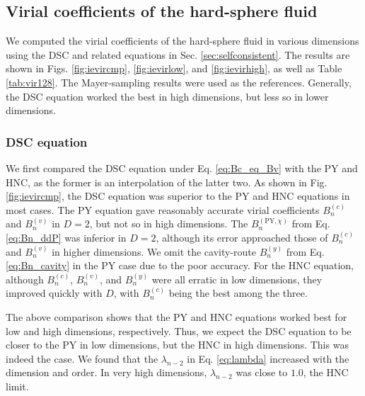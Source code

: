 \documentclass[aip,jcp,preprint,superscriptaddress,showpacs,preprintnumbers,amsmath,amssymb]{revtex4-1}
\begin{document}
\subsection{\label{sec:hs_results}
Virial coefficients of the hard-sphere fluid}





We computed the virial coefficients of the hard-sphere fluid
in various dimensions
using the DSC and related equations
in Sec. \ref{sec:selfconsistent}.
%
The results are shown
in Figs. \ref{fig:ievircmp},
\ref{fig:ievirlow},
and
\ref{fig:ievirhigh},
as well as Table \ref{tab:vir128}.
%
The Mayer-sampling results\cite{zhang2014, schultz2014}
were used as the references.
%
Generally,
the DSC equation worked the best
in high dimensions,
but less so in lower dimensions.





\subsubsection{DSC equation}





We first compared the DSC equation under
Eq. \eqref{eq:Bc_eq_Bv}
with the PY and HNC,
as the former is an interpolation of the latter two.
%
As shown in Fig. \ref{fig:ievircmp},
the DSC equation was superior to the PY and HNC equations
in most cases.
%
The PY equation gave
reasonably accurate virial coefficients
$B_n^{(c)}$ and $B_n^{(v)}$ in $D = 2$,
but not so in high dimensions.
%
The $B_n^{(\mathrm{PY}, \chi)}$
from Eq. \eqref{eq:Bn_ddP}
was inferior in $D = 2$,
although its error approached those
of $B_n^{(c)}$ and $B_n^{(v)}$
in higher dimensions.
%
We omit the cavity-route $B_n^{(y)}$
from Eq. \eqref{eq:Bn_cavity}
in the PY case due to the poor accuracy.
%
For the HNC equation,
although $B_n^{(c)}$,
$B_n^{(v)}$, and $B_n^{(y)}$
were all erratic in low dimensions,
they improved quickly with $D$,
with $B_n^{(c)}$ being the best among the three.



The above comparison shows that the PY and HNC equations
worked best for low and high dimensions, respectively.
%
Thus, we expect the DSC equation to be closer
to the PY in low dimensions,
but the HNC in high dimensions.
%
This was indeed the case.
%
We found that the $\lambda_{n-2}$ in Eq. \eqref{eq:lambda}
increased with the dimension and order.
%
In very high dimensions,
$\lambda_{n-2}$ was close to $1.0$,
the HNC limit.
\end{document}
